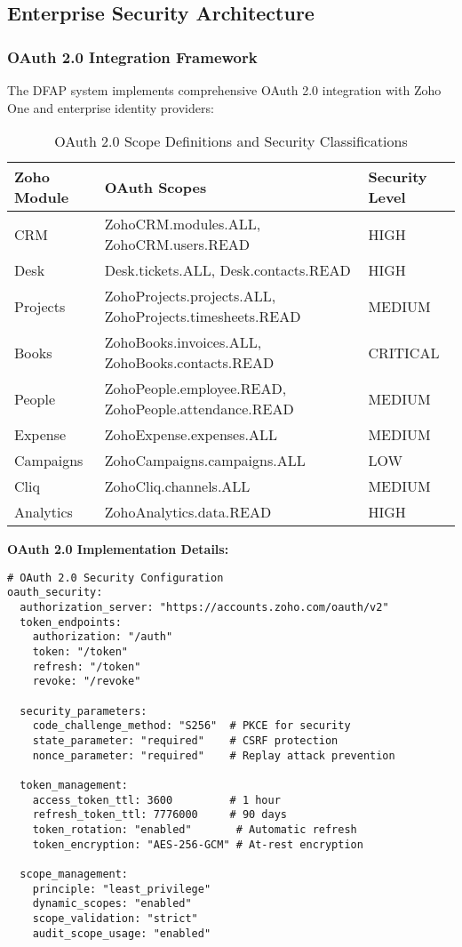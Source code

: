 \subsection{Enterprise Security Architecture}

\subsubsection{OAuth 2.0 Integration Framework}

The DFAP system implements comprehensive OAuth 2.0 integration with Zoho One and enterprise identity providers:

\begin{table}[h]
\centering
\begin{tabular}{|l|l|l|}
\hline
\textbf{Zoho Module} & \textbf{OAuth Scopes} & \textbf{Security Level} \\
\hline
CRM & ZohoCRM.modules.ALL, ZohoCRM.users.READ & HIGH \\
\hline
Desk & Desk.tickets.ALL, Desk.contacts.READ & HIGH \\
\hline
Projects & ZohoProjects.projects.ALL, ZohoProjects.timesheets.READ & MEDIUM \\
\hline
Books & ZohoBooks.invoices.ALL, ZohoBooks.contacts.READ & CRITICAL \\
\hline
People & ZohoPeople.employee.READ, ZohoPeople.attendance.READ & MEDIUM \\
\hline
Expense & ZohoExpense.expenses.ALL & MEDIUM \\
\hline
Campaigns & ZohoCampaigns.campaigns.ALL & LOW \\
\hline
Cliq & ZohoCliq.channels.ALL & MEDIUM \\
\hline
Analytics & ZohoAnalytics.data.READ & HIGH \\
\hline
\end{tabular}
\caption{OAuth 2.0 Scope Definitions and Security Classifications}
\end{table}

\textbf{OAuth 2.0 Implementation Details:}

\begin{verbatim}
# OAuth 2.0 Security Configuration
oauth_security:
  authorization_server: "https://accounts.zoho.com/oauth/v2"
  token_endpoints:
    authorization: "/auth"
    token: "/token" 
    refresh: "/token"
    revoke: "/revoke"
    
  security_parameters:
    code_challenge_method: "S256"  # PKCE for security
    state_parameter: "required"    # CSRF protection
    nonce_parameter: "required"    # Replay attack prevention
    
  token_management:
    access_token_ttl: 3600         # 1 hour
    refresh_token_ttl: 7776000     # 90 days
    token_rotation: "enabled"       # Automatic refresh
    token_encryption: "AES-256-GCM" # At-rest encryption
    
  scope_management:
    principle: "least_privilege"
    dynamic_scopes: "enabled"
    scope_validation: "strict"
    audit_scope_usage: "enabled"
\end{verbatim}

